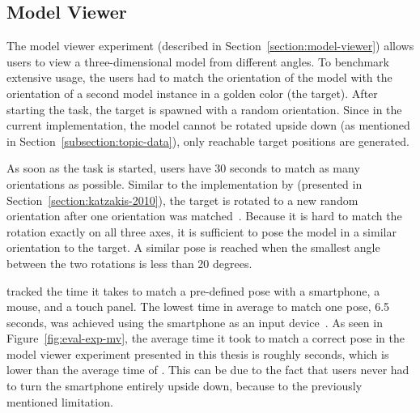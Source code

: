 \subsection{Model Viewer}\label{section:eval-res-mv}

The model viewer experiment (described in Section~\ref{section:model-viewer}) allows users to view a three-dimensional model from different angles. To benchmark extensive usage, the users had to match the orientation of the model with the orientation of a second model instance in a golden color (the target). After starting the task, the target is spawned with a random orientation.
Since in the current implementation, the model cannot be rotated upside down (as mentioned in Section~\ref{subsection:topic-data}), only reachable target positions are generated.

As soon as the task is started, users have 30 seconds to match as many orientations as possible. Similar to the implementation by \citeauthor{Katzakis.2010} (presented in Section~\ref{section:katzakis-2010}), the target is rotated to a new random orientation after one orientation was matched~\cite[140]{Katzakis.2010}.
Because it is hard to match the rotation exactly on all three axes, it is sufficient to pose the model in a similar orientation to the target. A similar pose is reached when the smallest angle between the two rotations is less than 20 degrees.

\citeauthor{Katzakis.2010} tracked the time it takes to match a pre-defined pose with a smartphone, a mouse, and a touch panel. The lowest time in average to match one pose, 6.5 seconds, was achieved using the smartphone as an input device~\cite[140]{Katzakis.2010}. As seen in Figure~\ref{fig:eval-exp-mv}, the average time it took to match a correct pose in the model viewer experiment presented in this thesis is roughly \evalExpMvAvgPoses{} seconds, which is lower than the average time of \citeauthor{Katzakis.2010}. This can be due to the fact that users never had to turn the smartphone entirely upside down, because to the previously mentioned limitation.

